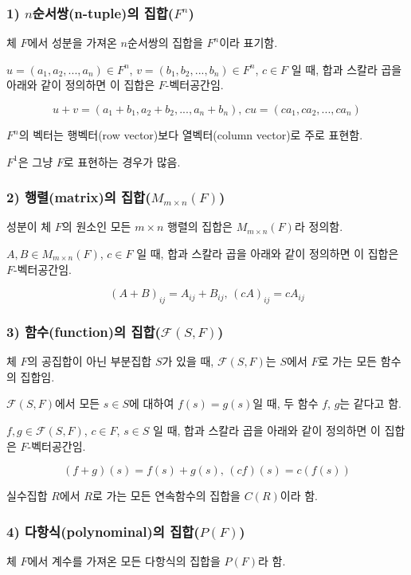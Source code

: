 \subsubsection*{1) $n$순서쌍(n-tuple)의 집합($F^n$)}
체 $F$에서 성분을 가져온 $n$순서쌍의 집합을 $F^n$이라 표기함.

$u=(a_1,a_2, ... ,a_n) \in F^n$, $v=(b_1,b_2, ... ,b_n) \in F^n$, $c \in F$ 일 때, 합과 스칼라 곱을 아래와 같이 정의하면 이 집합은 $F$-벡터공간임.

\[u+v=(a_1+b_1,a_2+b_2, ... ,a_n+b_n),\,cu=(ca_1,ca_2, ... ,ca_n)\]

$F^n$의 벡터는 행벡터(row vector)보다 열벡터(column vector)로 주로 표현함.

$F^1$은 그냥 $F$로 표현하는 경우가 많음.


\subsubsection*{2) 행렬(matrix)의 집합($M_{m \times n}(F)$)}
성분이 체 $F$의 원소인 모든 $m \times n$ 행렬의 집합은 $M_{m \times n}(F)$라 정의함.

$A,B \in M_{m \times n}(F)$, $c \in F$ 일 때, 합과 스칼라 곱을 아래와 같이 정의하면 이 집합은 $F$-벡터공간임.

\[(A+B)_{ij}=A_{ij}+B_{ij},\,(cA)_{ij}=cA_{ij}\]


\subsubsection*{3) 함수(function)의 집합($\mathcal{F}(S,F)$)}
체 $F$의 공집합이 아닌 부분집합 $S$가 있을 때, $\mathcal{F}(S,F)$는 $S$에서 $F$로 가는 모든 함수의 집합임.

$\mathcal{F}(S,F)$에서 모든 $s \in S$에 대하여 $f(s)=g(s)$일 때, 두 함수 $f$, $g$는 같다고 함.

$f,g \in \mathcal{F}(S,F)$, $c \in F$, $s \in S$ 일 때, 합과 스칼라 곱을 아래와 같이 정의하면 이 집합은 $F$-벡터공간임.

\[(f+g)(s)=f(s)+g(s),\,(cf)(s)=c(f(s))\]

실수집합 $R$에서 $R$로 가는 모든 연속함수의 집합을 $C(R)$이라 함.\\


\subsubsection*{4) 다항식(polynominal)의 집합($P(F)$)}
체 $F$에서 계수를 가져온 모든 다항식의 집합을 $P(F)$라 함.

